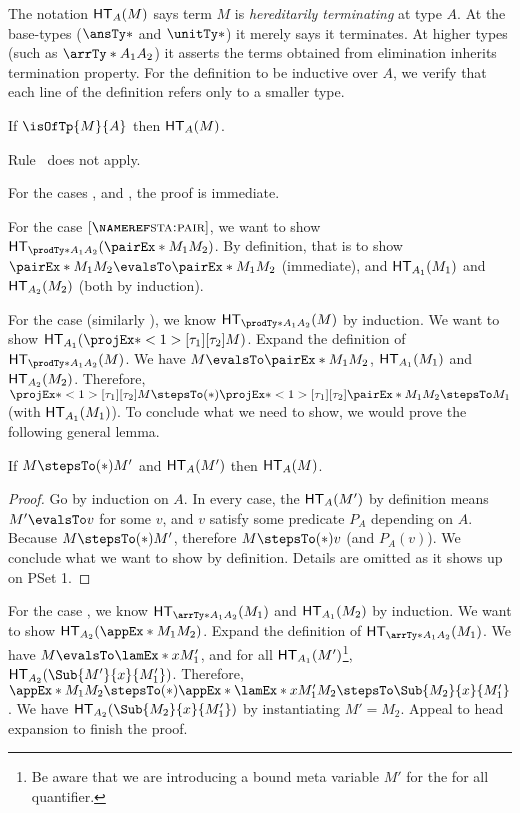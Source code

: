 \documentclass[letterpaper]{article}
\begin{document}
The notation $\HT[A](M)$ says term $M$ is \emph{hereditarily terminating} at type $A$. At the base-types
($\ansTy*$ and $\unitTy*$) it merely says it terminates. At higher types (such as $\arrTy*{A_1}{A_2}$)
it asserts the terms obtained from elimination inherits termination property.
For the definition to be inductive over $A$, we verify that each line of the definition refers only to
a smaller type.

\begin{conjecture}
If $\isOfTp{M}{A}$ then $\HT[A](M)$.
\end{conjecture}

Rule~ does not apply.

For the cases ,  and , the proof is immediate.

For the case $\ruleref{sta:pair}$, we want to show $\HT[\prodTy*{A_1}{A_2}](\pairEx*{M_1}{M_2})$.
By definition, that is to show $\pairEx*{M_1}{M_2} \evalsTo \pairEx*{M_1}{M_2}$ (immediate),
and $\HT[A_1](M_1)$ and $\HT[A_2](M_2)$ (both by induction).

For the case  (similarly ), we know $\HT[\prodTy*{A_1}{A_2}](M)$
by induction. We want to show $\HT[A_1](\fstEx*{M})$. Expand the definition of $\HT[\prodTy*{A_1}{A_2}](M)$.
We have $M \evalsTo \pairEx*{M_1}{M_2}$, $\HT[A_1](M_1)$ and $\HT[A_2](M_2)$. Therefore,
$\fstEx*{M} \stepsTo(*) \fstEx*{\pairEx*{M_1}{M_2}} \stepsTo M_1$ (with $\HT[A_1](M_1)$).
To conclude what we need to show, we would prove the following general lemma.

\begin{lemma}\label{lem:head-expansion}
If $M \stepsTo(*) M'$ and $\HT(M')$ then $\HT(M)$.
\end{lemma}
\begin{proof}
Go by induction on $A$. In every case, the $\HT(M')$ by definition means $M' \evalsTo v$ for some $v$,
and $v$ satisfy some predicate $P_A$ depending on $A$. Because $M \stepsTo(*) M'$, therefore
$M \stepsTo(*) v$ (and $P_A(v)$). We conclude what we want to show by definition. Details are omitted as it shows up on PSet 1.
\end{proof}

For the case , we know $\HT[\arrTy*{A_1}{A_2}](M_1)$ and $\HT[A_1](M_2)$ by induction.
We want to show $\HT[A_2](\appEx*{M_1}{M_2})$. Expand the definition of $\HT[\arrTy*{A_1}{A_2}](M_1)$.
We have $M \evalsTo \lamEx*{x}{M_1'}$, and for all $\HT[A_1](M')$\footnote{Be aware that we
are introducing a bound meta variable $M'$ for the for all quantifier.}, $\HT[A_2](\Sub{M'}{x}{M_1'})$.
Therefore, $\appEx*{M_1}{M_2} \stepsTo(*) \appEx*{\lamEx*{x}{M_1'}}{M_2}
\stepsTo \Sub{M_2}{x}{M_1'}$. We have $\HT[A_2]{(\Sub{M_2}{x}{M_1'})}$ by instantiating $M' = M_2$.
Appeal to head expansion to finish the proof.
\end{document}
